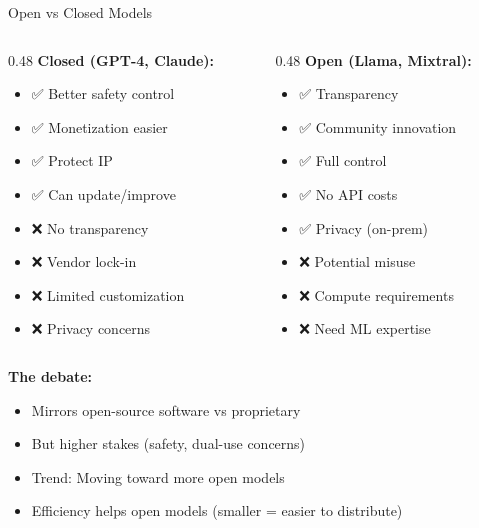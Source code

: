 \documentclass[aspectratio=169]{beamer}
\begin{document}
\begin{frame}[shrink=10]{Open vs Closed Models 🤔}
\begin{columns}[T]
\begin{column}{0.48\textwidth}
\textbf{Closed (GPT-4, Claude):}
\begin{itemize}\setlength{\itemsep}{0pt}
    \item ✅ Better safety control
    \item ✅ Monetization easier
    \item ✅ Protect IP
    \item ✅ Can update/improve
    \item ❌ No transparency
    \item ❌ Vendor lock-in
    \item ❌ Limited customization
    \item ❌ Privacy concerns
\end{itemize}
\end{column}

\begin{column}{0.48\textwidth}
\textbf{Open (Llama, Mixtral):}
\begin{itemize}\setlength{\itemsep}{0pt}
    \item ✅ Transparency
    \item ✅ Community innovation
    \item ✅ Full control
    \item ✅ No API costs
    \item ✅ Privacy (on-prem)
    \item ❌ Potential misuse
    \item ❌ Compute requirements
    \item ❌ Need ML expertise
\end{itemize}
\end{column}
\end{columns}

\vspace{0.5em}

\textbf{The debate:}
\begin{itemize}\setlength{\itemsep}{0pt}
    \item Mirrors open-source software vs proprietary
    \item But higher stakes (safety, dual-use concerns)
    \item Trend: Moving toward more open models
    \item Efficiency helps open models (smaller = easier to distribute)
\end{itemize}
\end{frame}
\end{document}
